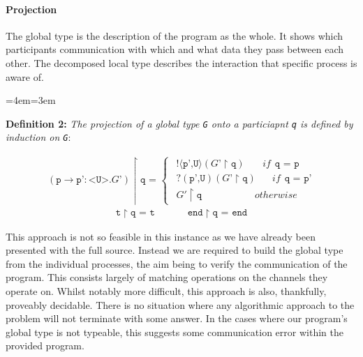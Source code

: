 \documentclass[11pt, abstracton, twoside, titlepage=true]{scrartcl}
\newenvironment{blockquote}{
	\par
	\medskip
	\leftskip=4em\rightskip=3em
	\noindent\ignorespaces
}{
	\par\medskip
}
\begin{document}
\paragraph{Projection}
The global type is the description of the program as the whole. It shows which 
participants communication with which and what data they pass between each other. 
The decomposed local type describes the interaction that specific process is aware 
of.

\begin{blockquote}
  \textbf{Definition 2:} \emph{The projection of a global type \texttt{G} onto 
  a particiapnt \texttt{q} is defined by induction on \texttt{G}}:
\end{blockquote}
\begin{align*}
  (\texttt{p} \rightarrow \texttt{p'}:\texttt{<U>}.\texttt{$G$'}) \upharpoonright \texttt{q = }  
  \begin{cases}
\hspace{5pt} !\langle \texttt{p',U} \rangle (\texttt{$G$'}\upharpoonright \texttt{q}) \hspace{22pt}if \hspace{5pt} \texttt{q = p} \\
\hspace{5pt} ?(\texttt{p',U}) (\texttt{$G$'}\upharpoonright \texttt{q}) \hspace{20pt}if \hspace{5pt} \texttt{q = p'} \\
\hspace{5pt} \texttt{$G'$}\upharpoonright \texttt{q} \hspace{65pt} otherwise
  \end{cases}
\end{align*}
\begin{align*}
  \texttt{t} \upharpoonright \texttt{q = t} 
  \hspace{40pt} \texttt{end} \upharpoonright \texttt{q = end}
\end{align*}

This approach is not so feasible in this instance as we have already been 
presented with the full source. Instead we are required to build the global
type from the individual processes, the aim being to verify
the communication of the program. This consists largely of 
matching operations on the channels they operate on. Whilst notably more
difficult, this approach is also, thankfully, proveably decidable. There is
no situation where any algorithmic approach to the problem will not terminate
with some answer. In the cases where our program's global type is not
typeable, this suggests some communication error within the provided program.
\end{document}
